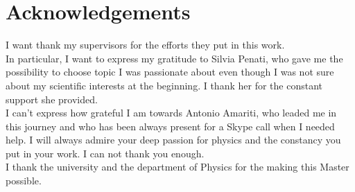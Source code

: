 

\chapter*{Acknowledgements}

I want thank my supervisors for the efforts they put in this work.\\
In particular, I want to express my gratitude to Silvia Penati, who gave me the possibility to choose topic I was passionate about even though I was not sure about my scientific interests at the beginning. 
I thank her for the constant support she provided.
\\
I can't express how grateful I am towards Antonio Amariti, who leaded me in this journey and who has been always present for a Skype call when I needed help.
I will always admire your deep passion for physics and the constancy you put in your work.  I can not thank you enough.
\\
I thank the university and the department of Physics for the making this Master possible.

